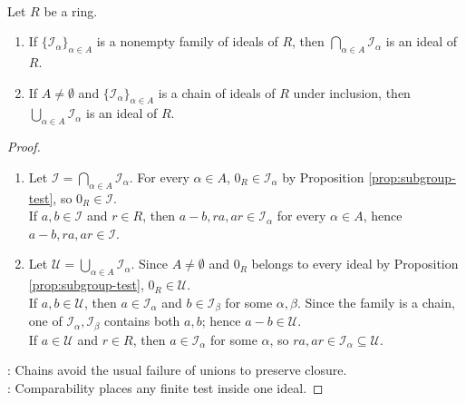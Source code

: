 \begin{proposition} \label{prop:intersections-and-chain-unions-of-ideals} \\
Let $R$ be a ring.
\begin{enumerate}[label=(\roman*)]
\setlength{\itemsep}{0pt}
\item If $\{\mathcal{I}_{\alpha}\}_{\alpha\in A}$ is a nonempty family of ideals of $R$, then $\bigcap_{\alpha\in A}\mathcal{I}_{\alpha}$ is an ideal of $R$.
\item If $A\neq\emptyset$ and $\{\mathcal{I}_{\alpha}\}_{\alpha\in A}$ is a chain of ideals of $R$ under inclusion, then $\bigcup_{\alpha\in A}\mathcal{I}_{\alpha}$ is an ideal of $R$.
\end{enumerate}
\begin{proof}
\begin{enumerate}[label=(\roman*)]
\setlength{\itemsep}{0pt}
\item Let $\mathcal{I}=\bigcap_{\alpha\in A}\mathcal{I}_{\alpha}$. For every $\alpha\in A$, $0_R\in\mathcal{I}_{\alpha}$ by Proposition \ref{prop:subgroup-test}, so $0_R\in\mathcal{I}$.\\
If $a,b\in\mathcal{I}$ and $r\in R$, then $a-b,ra,ar\in\mathcal{I}_{\alpha}$ for every $\alpha\in A$, hence $a-b,ra,ar\in\mathcal{I}$.
\item Let $\mathcal{U}=\bigcup_{\alpha\in A}\mathcal{I}_{\alpha}$. Since $A\neq\emptyset$ and $0_R$ belongs to every ideal by Proposition \ref{prop:subgroup-test}, $0_R\in\mathcal{U}$.\\
If $a,b\in\mathcal{U}$, then $a\in\mathcal{I}_{\alpha}$ and $b\in\mathcal{I}_{\beta}$ for some $\alpha,\beta$. Since the family is a chain, one of $\mathcal{I}_{\alpha},\mathcal{I}_{\beta}$ contains both $a,b$; hence $a-b\in\mathcal{U}$.\\
If $a\in\mathcal{U}$ and $r\in R$, then $a\in\mathcal{I}_{\alpha}$ for some $\alpha$, so $ra,ar\in\mathcal{I}_{\alpha}\subseteq\mathcal{U}$.
\end{enumerate}
: Chains avoid the usual failure of unions to preserve closure.\\
: Comparability places any finite test inside one ideal.
\end{proof}
\end{proposition}
